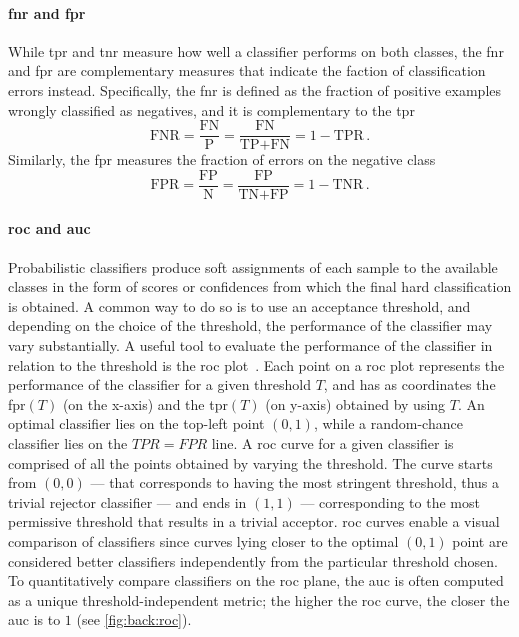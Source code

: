 \paragraph{\acrshort{fnr} and \acrshort{fpr}}
While \gls{tpr} and \gls{tnr} measure how well a classifier performs on both classes, the \gls{fnr} and \gls{fpr} are complementary measures that indicate the faction of classification errors instead.
Specifically, the \gls{fnr} is defined as the fraction of positive examples wrongly classified as negatives, and it is complementary to the \gls{tpr}
\begin{equation} \label{eq:back:fnr}
    \text{FNR} = \frac{\text{FN}}{\text{P}} = \frac{\text{FN}}{\text{TP} + \text{FN}} = 1 - \text{TPR}\,.
\end{equation}
Similarly, the \gls{fpr} measures the fraction of errors on the negative class
\begin{equation} \label{eq:back:fpr}
    \text{FPR} = \frac{\text{FP}}{\text{N}} = \frac{\text{FP}}{\text{TN} + \text{FP}} = 1 - \text{TNR}\,.
\end{equation}

\paragraph{\acrshort{roc} and \acrshort{auc}}
Probabilistic classifiers produce soft assignments of each sample to the available classes in the form of scores or confidences from which the final hard classification is obtained.
A common way to do so is to use an acceptance threshold, and depending on the choice of the threshold, the performance of the classifier may vary substantially.
A useful tool to evaluate the performance of the classifier in relation to the threshold is the \gls{roc} plot~\cite{fawcett2006introduction}.
Each point on a \gls{roc} plot represents the performance of the classifier for a given threshold $T$, and has as coordinates the \gls{fpr}$(T)$ (on the x-axis) and the \gls{tpr}$(T)$ (on y-axis) obtained by using $T$.
An optimal classifier lies on the top-left point $(0,1)$, while a random-chance classifier lies on the $TPR = FPR$ line.
A \gls{roc} curve for a given classifier is comprised of all the points obtained by varying the threshold.
The curve starts from $(0,0)$ --- that corresponds to having the most stringent threshold, thus a trivial rejector classifier --- and ends in $(1,1)$ --- corresponding to the most permissive threshold that results in a trivial acceptor.
\Gls{roc} curves enable a visual comparison of classifiers since curves lying closer to the optimal $(0,1)$ point are considered better classifiers independently from the particular threshold chosen.
To quantitatively compare classifiers on the \gls{roc} plane, the \gls{auc} is often computed as a unique threshold-independent metric;
the higher the \gls{roc} curve, the closer the \gls{auc} is to $1$ (see \ref{fig:back:roc}).

